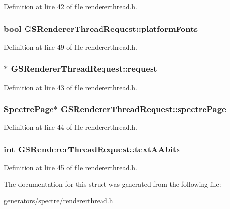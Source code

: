 Definition at line 42 of file rendererthread.\+h.

\hypertarget{structGSRendererThreadRequest_a9efa8790f1c00a65572ae49ca3dd50aa}{
\subsubsection[{platform\+Fonts}]{\setlength{\rightskip}{0pt plus 5cm}bool G\+S\+Renderer\+Thread\+Request\+::platform\+Fonts}}\label{structGSRendererThreadRequest_a9efa8790f1c00a65572ae49ca3dd50aa}


Definition at line 49 of file rendererthread.\+h.

\hypertarget{structGSRendererThreadRequest_a3ab9d0e1f64e36467d659eeeb8e31cad}{
\subsubsection[{request}]{$\ast$ G\+S\+Renderer\+Thread\+Request\+::request}}\label{structGSRendererThreadRequest_a3ab9d0e1f64e36467d659eeeb8e31cad}


Definition at line 43 of file rendererthread.\+h.

\hypertarget{structGSRendererThreadRequest_a267d15a82d942e6bde7e2d4a8467176e}{
\subsubsection[{spectre\+Page}]{\setlength{\rightskip}{0pt plus 5cm}Spectre\+Page$\ast$ G\+S\+Renderer\+Thread\+Request\+::spectre\+Page}}\label{structGSRendererThreadRequest_a267d15a82d942e6bde7e2d4a8467176e}


Definition at line 44 of file rendererthread.\+h.

\hypertarget{structGSRendererThreadRequest_adef07f37b7a796c8b706b7a51edbad60}{
\subsubsection[{text\+A\+Abits}]{\setlength{\rightskip}{0pt plus 5cm}int G\+S\+Renderer\+Thread\+Request\+::text\+A\+Abits}}\label{structGSRendererThreadRequest_adef07f37b7a796c8b706b7a51edbad60}


Definition at line 45 of file rendererthread.\+h.



The documentation for this struct was generated from the following file\+:\begin{DoxyCompactItemize}
\item 
generators/spectre/\hyperlink{rendererthread_8h}{rendererthread.\+h}\end{DoxyCompactItemize}
